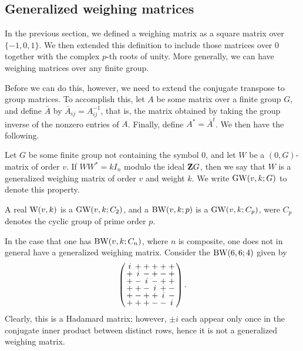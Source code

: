 \documentclass[../../../main]{subfiles}
\begin{document}
\subsection{Generalized weighing matrices}

In the previous section, we defined a weighing matrix as a square matrix over $\{-1,0,1\}$. We then extended this definition to include those matrices over $0$ together with the complex $p$-th roots of unity. More generally, we can have weighing matrices over any finite group. 

Before we can do this, however, we need to extend the conjugate transpose to group matrices. To accomplish this, let $A$ be some matrix over a finite group $G$, and define $\bar A$ by $\bar{A}_{ij}=A_{ij}^{-1}$, that is, the matrix obtained by taking the group inverse of the nonzero entries of $A$. Finally, define $A^* = \bar{A}^t$. We then have the following.
 
 \begin{defin}\label{group weighing}
  Let $G$ be some finite group not containing the symbol $0$, and let $W$ be a $(0,G)$-matrix of order $v$. If $WW^* = kI_n$ modulo the ideal $\mathbf{Z} G$, then we say that $W$ is a generalized weighing matrix of order $v$ and weight $k$. We write $\text{GW}(v,k;G)$ to denote this property.
 \end{defin}

 \begin{ex}
  A real $\text{W}(v,k)$ is a $\text{GW}(v,k;C_2)$, and a $\text{BW}(v,k;p)$ is a $\text{GW}(v,k;C_p)$, were $C_p$ denotes the cyclic group of prime order $p$.
 \end{ex}
 
 \begin{ex}
  In the case that one has $\text{BW}(v,k;C_n)$, where $n$ is composite, one does not in general have a generalized weighing matrix. Consider the $\text{BW}(6,6;4)$ given by
  \begin{equation}
  \arraycolsep=1.25pt\def\arraystretch{0.625}
\left(\begin{array}{cccccc}
i & + & + & + & + & + \\
+ & i & - & + & - & + \\
+ & - & i & - & + & + \\
+ & + & - & i & + & - \\
+ & - & + & + & i & - \\
+ & + & + & - & - & i
\end{array}\right).
  \end{equation}
  Clearly, this is a Hadamard matrix; however, $\pm i$ each appear only once in the conjugate inner product between distinct rows, hence it is not a generalized weighing matrix.
 \end{ex}
 
\end{document}
